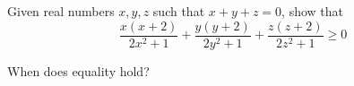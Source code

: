 Given real numbers $x,y,z$ such that $x+y+z=0$,  show that\[\dfrac{x(x+2)}{2x^2+1}+\dfrac{y(y+2)}{2y^2+1}+\dfrac{z(z+2)}{2z^2+1}\ge 0\]

When does equality hold?